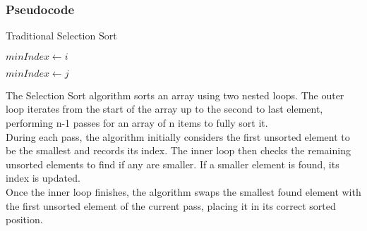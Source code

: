 \subsubsection{Pseudocode}
\begin{algorithm}
\caption{Traditional Selection Sort}
\begin{algorithmic}[1]
        \State $minIndex \gets i$
        
                \State $minIndex \gets j$
            \EndIf
        \EndFor

        \State {}
    \EndFor
\EndProcedure
\end{algorithmic}
\end{algorithm}
The Selection Sort algorithm sorts an array using two nested loops. The outer loop iterates from the start of the array up to the second to last element, performing n-1 passes for an array of n items to fully sort it. \\
During each pass, the algorithm initially considers the first unsorted element to be the smallest and records its index. The inner loop then checks the remaining unsorted elements to find if any are smaller. If a smaller element is found, its index is updated.\\
Once the inner loop finishes, the algorithm swaps the smallest found element with the first unsorted element of the current pass, placing it in its correct sorted position.\\


